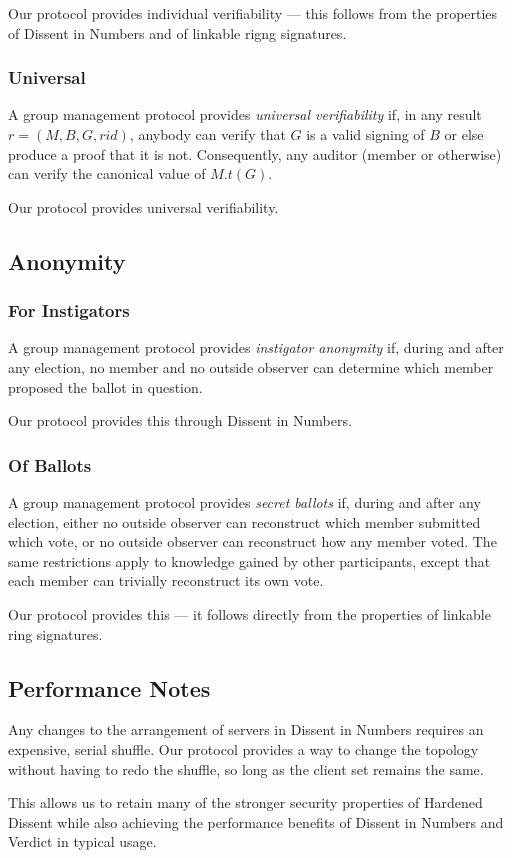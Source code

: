     Our protocol provides individual verifiability --- this follows from the
    properties of Dissent in Numbers and of linkable rigng signatures.%
    \subsubsection{Universal}
    A group management protocol provides \emph{universal verifiability} if, in
    any result $r = (M, B, G, rid)$, anybody can verify that $G$ is a valid
    signing of $B$ or else produce a proof that it is not. Consequently, any
    auditor (member or otherwise) can verify the canonical value of $M.t(G)$.

    Our protocol provides universal verifiability.%
  \subsection{Anonymity}
    \subsubsection{For Instigators}
    A group management protocol provides \emph{instigator anonymity} if, during
    and after any election, no member and no outside observer can determine
    which member proposed the ballot in question.

    Our protocol provides this through Dissent in Numbers.
    \subsubsection{Of Ballots}
    A group management protocol provides \emph{secret ballots} if, during and
    after any election, either no outside observer can reconstruct which member
    submitted which vote, or no outside observer can reconstruct how any
    member voted. The same restrictions apply to knowledge gained by other
    participants, except that each member can trivially reconstruct its own vote.

    Our protocol provides this --- it follows directly from the properties of
    linkable ring signatures.
\subsection{Performance Notes}
Any changes to the arrangement of servers in Dissent in Numbers requires an
expensive, serial shuffle. Our protocol provides a way to change the topology
without having to redo the shuffle, so long as the client set remains the same.

This allows us to retain many of the stronger security properties of Hardened
Dissent\cite{syta_security_2014} while also achieving the performance benefits
of Dissent in Numbers and Verdict in typical usage.
